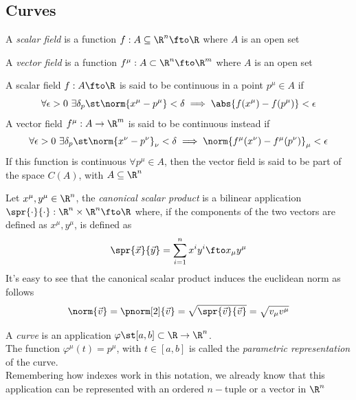 \documentclass[../mmf.tex]{subfiles}
\begin{document}
\subsection{Curves}
\begin{dfn}
	A \textit{scalar field} is a function $f:A\subseteq\R^n\fto\R$ where $A$ is an open set
\end{dfn}
\begin{dfn}
	A \textit{vector field} is a function $f^\mu:A\subset\R^n\fto\R^m$ where $A$ is an open set
\end{dfn}
\begin{dfn}[Continuity]
	A scalar field $f:A\fto\R$ is said to be continuous in a point $p^\mu\in A$ if
	\begin{equation}
		\forall\epsilon>0\ \exists\delta_p\st\norm{x^\mu-p^\mu}<\delta\implies{}\abs{f(x^\mu)-f(p^\mu)}<\epsilon
		\label{eq:scalarfieldcont}
	\end{equation}
	A vector field $f^\mu:A\to\R^m$ is said to be continuous instead if
	\begin{equation}
		\forall\epsilon>0\ \exists\delta_{p}\st\norm{x^\nu-p^\nu}_\nu<\delta\implies{}\norm{f^\mu(x^\nu)-f^\mu(p^\nu)}_\mu<\epsilon
		\label{eq:vecfieldcont}
	\end{equation}
	If this function is continuous $\forall p^\mu\in A$, then the vector field is said to be part of the space $C(A)$, with $A\subseteq\R^n$
\end{dfn}
\begin{dfn}
	Let $x^\mu,y^\mu\in\R^n$, the \textit{canonical scalar product} is a bilinear application $\spr{\cdot}{\cdot}:\R^n\times\R^n\fto\R$ where, if the components of the two vectors are defined as $x^\mu,y^\mu$, is defined as
	\begin{equation}
		\spr{\vec{x}}{\vec{y}}=\sum_{i=1}^nx^iy^i\fto x_\mu y^\mu
		\label{eq:scalarprod}
	\end{equation}
	It's easy to see that the canonical scalar product induces the euclidean norm as follows
	\begin{equation}
		\norm{\vec{v}}=\pnorm[2]{\vec{v}}=\sqrt{\spr{\vec{v}}{\vec{v}}}=\sqrt{v_\mu v^\mu}
		\label{eq:euclideannorm}
	\end{equation}
\end{dfn}
\begin{dfn}[Curves in $\R^n$]
	A \textit{curve} is an application $\varphi\st[a,b]\subset\R\to\R^n$.\\
	The function $\varphi^\mu(t)=p^\mu$, with $t\in[a,b]$ is called the \textit{parametric representation} of the curve.\\
	Remembering how indexes work in this notation, we already know that this application can be represented with an ordered $n-$tuple or a vector in $\R^n$
\end{dfn}
\end{document}
